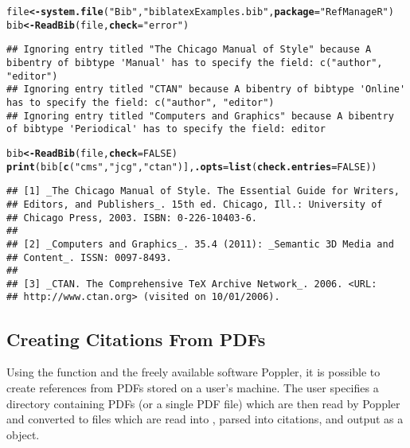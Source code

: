 \documentclass[article]{jss}\usepackage[]{graphicx}\usepackage[]{color}
\makeatletter
\newcommand{\hlnum}[1]{\textcolor[rgb]{0.125,0.125,1}{#1}}%
\newcommand{\hlstr}[1]{\textcolor[rgb]{0.125,0.125,1}{#1}}%
\newcommand{\hlstd}[1]{\textcolor[rgb]{0.251,0.251,0.282}{#1}}%
\newcommand{\hlkwb}[1]{\textcolor[rgb]{0.439,0.251,1}{\textbf{#1}}}%
\newcommand{\hlkwc}[1]{\textcolor[rgb]{0.529,0,0.184}{\textbf{#1}}}%
\newcommand{\hlkwd}[1]{\textcolor[rgb]{0.251,0.251,0.282}{\textbf{#1}}}%
\newenvironment{kframe}{%
 \def\at@end@of@kframe{}%
 \ifinner\ifhmode%
  \def\at@end@of@kframe{\end{minipage}}%
  \begin{minipage}{\columnwidth}%
 \fi\fi%
 \def\FrameCommand##1{\hskip\@totalleftmargin \hskip-\fboxsep
 \colorbox{shadecolor}{##1}\hskip-\fboxsep
     \hskip-\linewidth \hskip-\@totalleftmargin \hskip\columnwidth}%
 \MakeFramed {\advance\hsize-\width
   \@totalleftmargin\z@ \linewidth\hsize
   \@setminipage}}%
 {\par\unskip\endMakeFramed%
 \at@end@of@kframe}
\newenvironment{knitrout}{}{} %
\makeatother
\begin{document}
\begin{knitrout}
\color{fgcolor}\begin{kframe}
\begin{alltt}
\hlstd{file} \hlkwb{<-} \hlkwd{system.file}\hlstd{(}\hlstr{"Bib"}\hlstd{,} \hlstr{"biblatexExamples.bib"}\hlstd{,} \hlkwc{package} \hlstd{=} \hlstr{"RefManageR"}\hlstd{)}
\hlstd{bib} \hlkwb{<-} \hlkwd{ReadBib}\hlstd{(file,} \hlkwc{check} \hlstd{=} \hlstr{"error"}\hlstd{)}
\end{alltt}
\begin{lstlisting}
## Ignoring entry titled "The Chicago Manual of Style" because A bibentry of bibtype 'Manual' has to specify the field: c("author", "editor")
## Ignoring entry titled "CTAN" because A bibentry of bibtype 'Online' has to specify the field: c("author", "editor")
## Ignoring entry titled "Computers and Graphics" because A bibentry of bibtype 'Periodical' has to specify the field: editor
\end{lstlisting}\begin{alltt}
\hlstd{bib} \hlkwb{<-} \hlkwd{ReadBib}\hlstd{(file,} \hlkwc{check} \hlstd{=} \hlnum{FALSE}\hlstd{)}
\hlkwd{print}\hlstd{(bib[}\hlkwd{c}\hlstd{(}\hlstr{"cms"}\hlstd{,} \hlstr{"jcg"}\hlstd{,} \hlstr{"ctan"}\hlstd{)],} \hlkwc{.opts} \hlstd{=} \hlkwd{list}\hlstd{(}\hlkwc{check.entries} \hlstd{=} \hlnum{FALSE}\hlstd{))}
\end{alltt}
\begin{verbatim}
## [1] _The Chicago Manual of Style. The Essential Guide for Writers,
## Editors, and Publishers_. 15th ed. Chicago, Ill.: University of
## Chicago Press, 2003. ISBN: 0-226-10403-6.
## 
## [2] _Computers and Graphics_. 35.4 (2011): _Semantic 3D Media and
## Content_. ISSN: 0097-8493.
## 
## [3] _CTAN. The Comprehensive TeX Archive Network_. 2006. <URL:
## http://www.ctan.org> (visited on 10/01/2006).
\end{verbatim}
\end{kframe}
\end{knitrout}


\subsection{Creating Citations From PDFs}
Using the function  and the freely available software Poppler, it is possible to create references from PDFs stored on a user's machine.  The user specifies a directory containing PDFs (or a single PDF file) which are then read by Poppler and converted to  files which are read into \R{}, parsed into citations, and output as a  object.  
\end{document}
